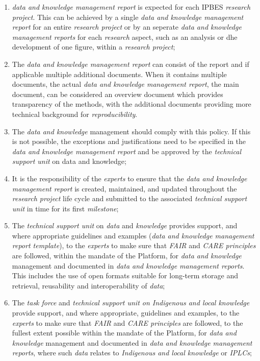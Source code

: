 \documentclass{article}
\begin{document}
\begin{enumerate}[label=(\alph*)]
    \item \textit{data and knowledge management report} is expected for each IPBES \textit{research project}. This can be achieved by a single \textit{data and knowledge management report} for an entire \textit{research project} or by an seperate \textit{data and knowledge management reports} for each \textit{research} aspect, such as an analysis or dhe development of one figure, within a \textit{research project};

    \item The \textit{data and knowledge management report} can consist of the report and if applicable multiple additional documents. When it contains multiple documents, the actual \textit{data and knowledge management report}, the main document, can be considered an overview document which provides transparency of the methods, with the additional documents providing more technical background for \textit{reproducibility}.

    \item The \textit{data and knowledge} management should comply with this policy. If this is not possible, the exceptions and justifications need to be specified in the \textit{data and knowledge management report} and be approved by the \textit{technical support unit} on data and knowledge;

    \item It is the responsibility of the \textit{experts} to ensure that the \textit{data and knowledge management report} is created, maintained, and updated throughout the \textit{research project} life cycle and submitted to the associated \textit{technical support unit} in time for its first \textit{milestone};

    \item The \textit{technical support unit} on \textit{data} and \textit{knowledge} provides support, and where appropriate guidelines and examples (\textit{data and knowledge management report template}), to the \textit{experts} to make sure that \textit{FAIR} and \textit{CARE principles} are followed, within the mandate of the Platform, for \textit{data and knowledge} management and documented in \textit{data and knowledge management reports}. This includes the use of open formats suitable for long-term storage and retrieval, reusability and interoperability of \textit{data};

    \item The \textit{task force} and \textit{technical support unit on Indigenous and local knowledge} provide support, and where appropriate, guidelines and examples, to the \textit{experts }to make sure that \textit{FAIR} and \textit{CARE principles} are followed, to the fullest extent possible within the mandate of the Platform, for \textit{data and knowledge} management and documented in \textit{data and knowledge management reports}, where such \textit{data} relates to \textit{Indigenous and local knowledge} or \textit{IPLCs};


\end{enumerate}
\end{document}
